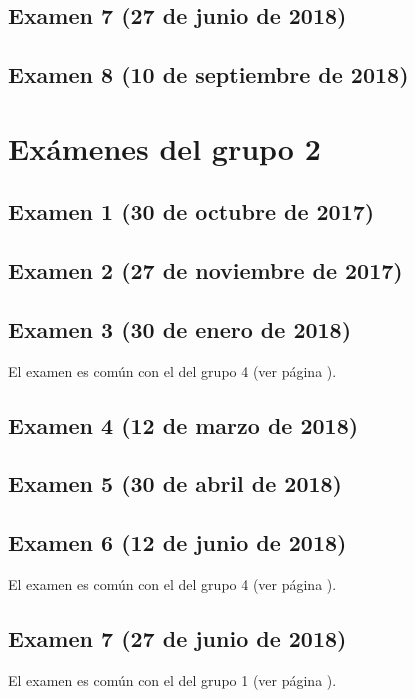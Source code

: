 \documentclass[a4paper,12pt,twoside]{book}
\begin{document}
\section{Examen 7 (27 de junio de 2018)}
 \label{examen_17_18_1_7}
\section{Examen 8 (10 de septiembre de 2018)}
 \label{examen_17_18_1_8}

\chapter{Exámenes del grupo 2}
\section{Examen 1 (30 de octubre de 2017)}
\section{Examen 2 (27 de noviembre de 2017)}
\section{Examen 3 (30 de enero de 2018)}
El examen es común con el del grupo 4 (ver página \pageref{examen_17_18_4_3}).
\section{Examen 4 (12 de marzo de 2018)}
\section{Examen 5 (30 de abril de 2018)}
\section{Examen 6 (12 de junio de 2018)}
El examen es común con el del grupo 4 (ver página \pageref{examen_17_18_4_6}).
\section{Examen 7 (27 de junio de 2018)}
El examen es común con el del grupo 1 (ver página \pageref{examen_17_18_1_7}).
\end{document}
